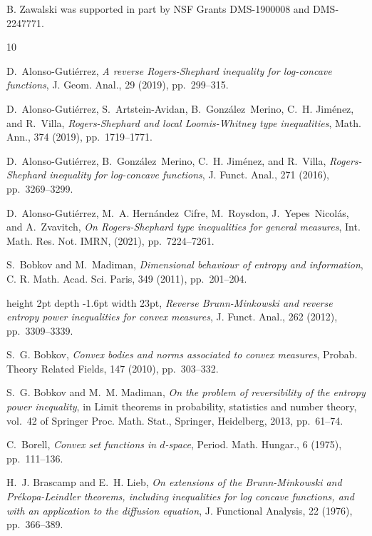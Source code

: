\documentclass[11pt]{amsart}
\theoremstyle{plain}
\theoremstyle{definition}
\theoremstyle{remark}
\begin{document}
B. Zawalski was supported in part by NSF Grants DMS-1900008 and DMS-2247771.
\begin{thebibliography}{10}

{\sc D.~Alonso-Guti\'errez}, {\em A reverse {R}ogers-{S}hephard inequality for log-concave functions}, J. Geom. Anal., 29 (2019), pp.~299--315.

{\sc D.~Alonso-Guti\'errez, S.~Artstein-Avidan, B.~Gonz\'alez~Merino, C.~H. Jim\'enez, and R.~Villa}, {\em Rogers-{S}hephard and local {L}oomis-{W}hitney type inequalities}, Math. Ann., 374 (2019), pp.~1719--1771.

{\sc D.~Alonso-Guti\'errez, B.~Gonz\'alez~Merino, C.~H. Jim\'enez, and R.~Villa}, {\em Rogers-{S}hephard inequality for log-concave functions}, J. Funct. Anal., 271 (2016), pp.~3269--3299.

{\sc D.~Alonso-Guti\'errez, M.~A. Hern\'andez~Cifre, M.~Roysdon, J.~Yepes~Nicol\'as, and A.~Zvavitch}, {\em On {R}ogers-{S}hephard type inequalities for general measures}, Int. Math. Res. Not. IMRN,  (2021), pp.~7224--7261.

{\sc S.~Bobkov and M.~Madiman}, {\em Dimensional behaviour of entropy and information}, C. R. Math. Acad. Sci. Paris, 349 (2011), pp.~201--204.

\leavevmode\vrule height 2pt depth -1.6pt width 23pt, {\em Reverse {B}runn-{M}inkowski and reverse entropy power inequalities for convex measures}, J. Funct. Anal., 262 (2012), pp.~3309--3339.

{\sc S.~G. Bobkov}, {\em Convex bodies and norms associated to convex measures}, Probab. Theory Related Fields, 147 (2010), pp.~303--332.

{\sc S.~G. Bobkov and M.~M. Madiman}, {\em On the problem of reversibility of the entropy power inequality}, in Limit theorems in probability, statistics and number theory, vol.~42 of Springer Proc. Math. Stat., Springer, Heidelberg, 2013, pp.~61--74.

{\sc C.~Borell}, {\em Convex set functions in {$d$}-space}, Period. Math. Hungar., 6 (1975), pp.~111--136.

{\sc H.~J. Brascamp and E.~H. Lieb}, {\em On extensions of the {B}runn-{M}inkowski and {P}r\'ekopa-{L}eindler theorems, including inequalities for log concave functions, and with an application to the diffusion equation}, J. Functional Analysis, 22 (1976), pp.~366--389.


\end{thebibliography}
\end{document}
